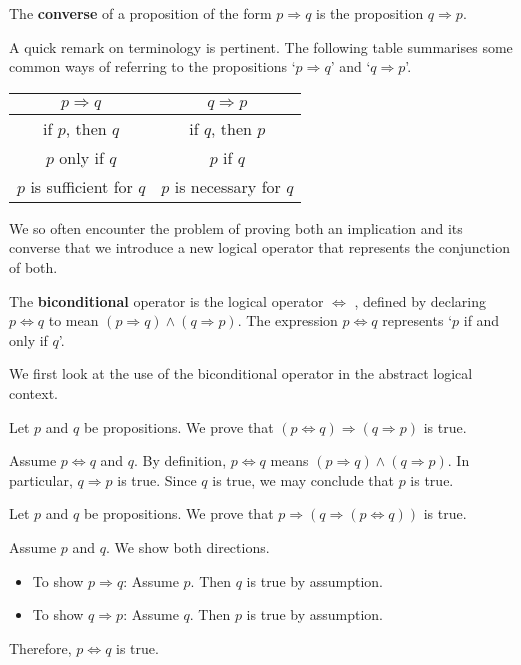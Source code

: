 \begin{definition}
\label{defConverse}
The \textbf{converse} of a proposition of the form $p \Rightarrow q$ is the proposition $q \Rightarrow p$.
\end{definition}

A quick remark on terminology is pertinent. The following table summarises some common ways of referring to the propositions `$p \Rightarrow q$' and `$q \Rightarrow p$'.

\begin{center}
\begin{tabular}{c|c}
$p \Rightarrow q$ & $q \Rightarrow p$ \\ \hline
if $p$, then $q$ & if $q$, then $p$ \\
$p$ only if $q$ & $p$ if $q$ \\
$p$ is sufficient for $q$ & $p$ is necessary for $q$
\end{tabular}
\end{center}

We so often encounter the problem of proving both an implication and its converse that we introduce a new logical operator that represents the conjunction of both.

\begin{definition}
\label{defBiconditional}
The \textbf{biconditional} operator is the logical operator $\Leftrightarrow$ , defined by declaring $p \Leftrightarrow q$ to mean $(p \Rightarrow q) \wedge (q \Rightarrow p)$. The expression $p \Leftrightarrow q$ represents `$p$ if and only if $q$'.
\end{definition}

We first look at the use of the biconditional operator in the abstract logical context.

\begin{example}
Let $p$ and $q$ be propositions. We prove that $(p \Leftrightarrow q) \Rightarrow (q \Rightarrow p)$ is true.

Assume $p \Leftrightarrow q$ and $q$. By definition, $p \Leftrightarrow q$ means $(p \Rightarrow q) \wedge (q \Rightarrow p)$. In particular, $q \Rightarrow p$ is true. Since $q$ is true, we may conclude that $p$ is true.
\end{example}

\begin{example}
Let $p$ and $q$ be propositions. We prove that $p \Rightarrow (q \Rightarrow (p \Leftrightarrow q))$ is true.

Assume $p$ and $q$. We show both directions.
\begin{itemize}
  \item To show $p \Rightarrow q$: Assume $p$. Then $q$ is true by assumption.
  \item To show $q \Rightarrow p$: Assume $q$. Then $p$ is true by assumption.
\end{itemize}
Therefore, $p \Leftrightarrow q$ is true.
\end{example}

